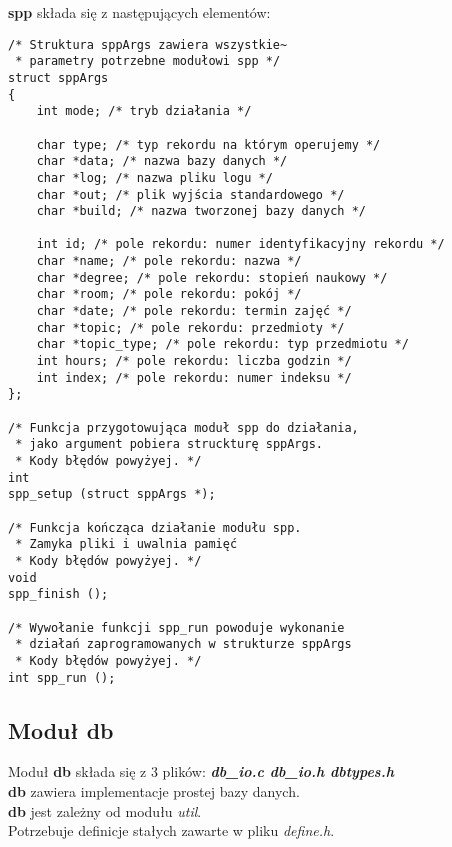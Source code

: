 \documentclass[bibtotocnumbered, headsepline,normalheadings,12pt,polish]{scrreprt}
\begin{document}
\textbf{spp} składa się z następujących elementów:
\begin{verbatim}
/* Struktura sppArgs zawiera wszystkie~
 * parametry potrzebne modułowi spp */
struct sppArgs
{
    int mode; /* tryb działania */

    char type; /* typ rekordu na którym operujemy */
    char *data; /* nazwa bazy danych */
    char *log; /* nazwa pliku logu */
    char *out; /* plik wyjścia standardowego */
    char *build; /* nazwa tworzonej bazy danych */

    int id; /* pole rekordu: numer identyfikacyjny rekordu */
    char *name; /* pole rekordu: nazwa */
    char *degree; /* pole rekordu: stopień naukowy */
    char *room; /* pole rekordu: pokój */
    char *date; /* pole rekordu: termin zajęć */
    char *topic; /* pole rekordu: przedmioty */
    char *topic_type; /* pole rekordu: typ przedmiotu */
    int hours; /* pole rekordu: liczba godzin */
    int index; /* pole rekordu: numer indeksu */
};

/* Funkcja przygotowująca moduł spp do działania, 
 * jako argument pobiera struckturę sppArgs.
 * Kody błędów powyżyej. */
int 
spp_setup (struct sppArgs *);

/* Funkcja kończąca działanie modułu spp.
 * Zamyka pliki i uwalnia pamięć
 * Kody błędów powyżyej. */
void 
spp_finish ();

/* Wywołanie funkcji spp_run powoduje wykonanie
 * działań zaprogramowanych w strukturze sppArgs
 * Kody błędów powyżyej. */
int spp_run ();
\end{verbatim}
\subsection{Moduł db}
\large
Moduł \textbf{db} składa się z 3 plików: \textit{\textbf{db\_io.c db\_io.h dbtypes.h }}\\
\textbf{db} zawiera implementacje prostej bazy danych.\\
\textbf{db} jest zależny od \large modułu \emph{util}.\large\\
Potrzebuje definicje stałych zawarte w pliku \large\emph{define.h}.\large\\
\end{document}
